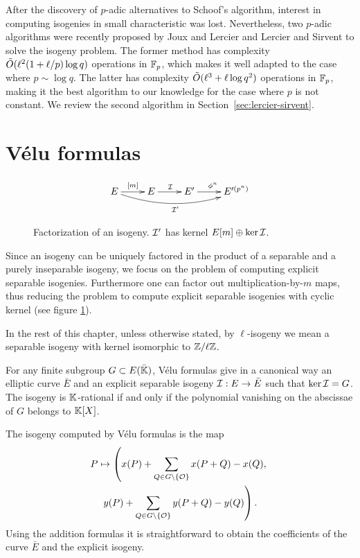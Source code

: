 After the discovery of $p$-adic alternatives to Schoof's
algorithm\cite{satoh00}, interest in computing isogenies in small
characteristic was lost. Nevertheless, two $p$-adic algorithms were
recently proposed by Joux and Lercier \cite{joux+lercier06} and
Lercier and Sirvent \cite{lercier+sirvent08} to solve the isogeny
problem. The former method has complexity $\tilde{O}(\ell^2(1 +
\ell/p)\log q)$ operations in $\mathbb{F}_p$, which makes it well adapted to
the case where $p\sim\log q$. The latter has complexity $\tilde{O}(\ell^3
+ \ell\log q^2)$ operations in $\mathbb{F}_p$, making it the best algorithm to
our knowledge for the case where $p$ is not constant. We review the
second algorithm in Section~\ref{sec:lercier-sirvent}.


\section{Vélu formulas}
\label{sec:velu-formulas}


\begin{figure}
  \centering
  \[\xymatrix{
    E \ar[r]^{[m]}\ar@/_1pc/[rrr]_{\I'} & E \ar[r]^\I & E' \ar[r]^{\frobisog^n} & E'^{(p^n)}\\
  }\]
  \label{fig:fact}
  \caption{Factorization of an isogeny. $\mathcal{I}'$ has kernel $E[m]\oplus\ker\mathcal{I}$.}
\end{figure}

Since an isogeny can be uniquely factored in the product of a
separable and a purely inseparable isogeny, we focus on the problem of
computing explicit separable isogenies. Furthermore one can factor out
multiplication-by-$m$ maps, thus reducing the problem to compute
explicit separable isogenies with cyclic kernel (see figure
\ref{fig:fact}).

In the rest of this chapter, unless otherwise stated, by
$\ell$-isogeny we mean a separable isogeny with kernel isomorphic to
$\mathbb{Z}/\ell\mathbb{Z}$.


For any finite subgroup $G \subset E(\bar{\mathbb{K}})$, Vélu formulas
\cite{Vel71} give in a canonical way an elliptic curve $\bar{E}$ and
an explicit separable isogeny $\mathcal{I}:E\rightarrow \bar{E}$ such that
$\ker\mathcal{I}=G$. The isogeny is $\mathbb{K}$-rational if and only if the polynomial
vanishing on the abscissae of $G$ belongs to $\mathbb{K}[X]$.

The isogeny computed by Vélu formulas is the map
\begin{multline}
  \label{eq:155}
  P\mapsto\left(x(P) + \sum_{Q\in G\backslash\{\mathcal{O}\}}x(P+Q) - x(Q),\right.\\
    \left.y(P) + \sum_{Q\in G\backslash\{\mathcal{O}\}}y(P+Q) - y(Q)\right)
  \text{.}
\end{multline}
Using the addition formulas it is straightforward to obtain the
coefficients of the curve $\bar{E}$ and the explicit isogeny.

